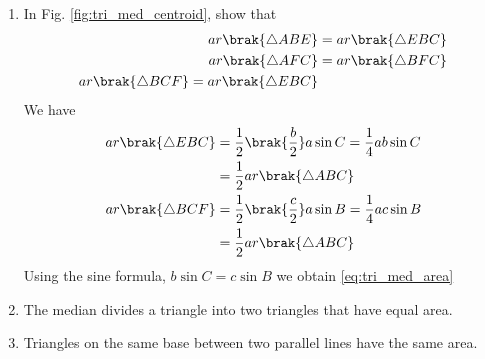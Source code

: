 %
\renewcommand{\theequation}{\theenumi}
\begin{enumerate}[label=\arabic*.,ref=\thesubsection.\theenumi]

\item In Fig. \ref{fig:tri_med_centroid}, show that 
%
\begin{align}
\label{eq:tri_med_area}
\begin{split}
ar\brak{\triangle ABE} &= ar \brak{\triangle EBC}
\\
ar\brak{\triangle AFC} &= ar \brak{\triangle BFC}
\\
ar\brak{\triangle BCF} = ar \brak{\triangle EBC}
\end{split}
\end{align}
%
\solution We have
%
\begin{align}
ar \brak{\triangle EBC} &= \frac{1}{2}\brak{\frac{b}{2}}a \sin C =  \frac{1}{4}ab \sin C 
\\
&= \frac{1}{2}ar\brak{\triangle ABC}
\\
ar \brak{\triangle BCF} &= \frac{1}{2}\brak{\frac{c}{2}}a \sin B =  \frac{1}{4}ac \sin B 
\\
&= \frac{1}{2}ar\brak{\triangle ABC}
\end{align}
%
Using the sine formula, $b \sin C = c \sin B$ we obtain \ref{eq:tri_med_area}
%
\item The median divides a triangle into two triangles that have equal area.
\item Triangles on the same base between two parallel lines have the same area.
%
\end{enumerate}
